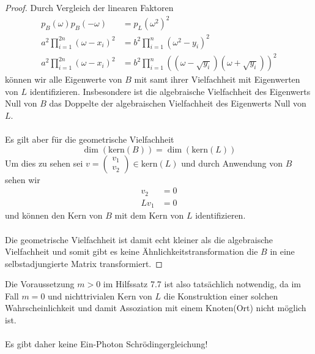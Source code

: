 \documentclass[11pt,a4paper,leqno]{report}
\numberwithin{equation}{chapter}
\begin{document}
\begin{proof}
Durch Vergleich der linearen Faktoren
\begin{align*}
	p_{B}(\omega)p_{B}(-\omega)&=p_{L}(\omega^2)^2\\
	a^2\prod_{i=1}^{2n}(\omega-x_i)^2 &= b^2\prod_{i=1}^n(\omega^2-y_i)^2\\
	a^2\prod_{i=1}^{2n}(\omega-x_i)^2 &= b^2\prod_{i=1}^n((\omega-\sqrt{y_i})(\omega+\sqrt{y_i}))^2
\end{align*}
k\"onnen wir alle Eigenwerte von $B$ mit samt ihrer Vielfachheit mit Eigenwerten von $L$ identifizieren. Insbesondere ist die algebraische Vielfachheit des Eigenwerts Null von $B$ das Doppelte der algebraischen Vielfachheit des Eigenwerts Null von $L$.\\
\\
Es gilt aber f\"ur die geometrische Vielfachheit
\begin{equation*}
	\dim(\text{kern}(B))=\dim(\text{kern}(L))
\end{equation*}
Um dies zu sehen sei $v=\begin{pmatrix}
	v_1  \\ v_2
\end{pmatrix}\in\text{kern}(L)$ und durch Anwendung von $B$ sehen wir
\begin{align*}
	v_2 &= 0\\
	Lv_1&= 0
\end{align*}
und k\"onnen den Kern von $B$ mit dem Kern von $L$ identifizieren.\\
\\
Die geometrische Vielfachheit ist damit echt kleiner als die algebraische Vielfachheit und somit gibt es keine \"Ahnlichkeitstransformation die $B$ in eine selbstadjungierte Matrix transformiert.
\end{proof}
\noindent
Die Voraussetzung $m>0$ im Hilfssatz 7.7 ist also tats\"achlich notwendig, da im Fall $m=0$ und nichttrivialen Kern von $L$ die Konstruktion einer solchen Wahrscheinlichkeit und damit Assoziation mit einem Knoten(Ort) nicht m\"oglich ist.
\\
\\
Es gibt daher keine Ein-Photon Schr\"odingergleichung!\\
\end{document}
